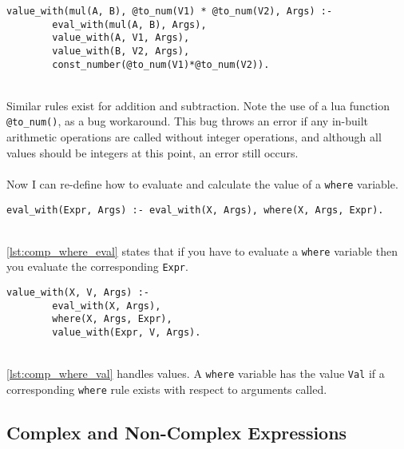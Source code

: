 \begin{lstlisting}[caption={Second attempt at multiplication}, label={lst:comp_mult}, firstnumber=57]
value_with(mul(A, B), @to_num(V1) * @to_num(V2), Args) :- 
		eval_with(mul(A, B), Args), 
		value_with(A, V1, Args), 
		value_with(B, V2, Args), 
		const_number(@to_num(V1)*@to_num(V2)).
\end{lstlisting}
\mbox{} \\
Similar rules exist for addition and subtraction. Note the use of a lua function \lstinline!@to_num()!, as a bug workaround. This bug throws an error if any in-built arithmetic operations are called without integer operations, and although all values should be integers at this point, an error still occurs. \\ \\
Now I can re-define how to evaluate and calculate the value of a \lstinline!where! variable. \\

\begin{lstlisting}[caption={Handling where evaluation}, label={lst:comp_where_eval}, firstnumber=76]
eval_with(Expr, Args) :- eval_with(X, Args), where(X, Args, Expr).
\end{lstlisting}
\mbox{} \\
\ref{lst:comp_where_eval} states that if you have to evaluate a \lstinline!where! variable then you evaluate the corresponding \lstinline!Expr!. \\
 
\begin{lstlisting}[caption={Handling where values}, label={lst:comp_where_val}, firstnumber=64]
value_with(X, V, Args) :- 
		eval_with(X, Args), 
		where(X, Args, Expr), 
		value_with(Expr, V, Args).
\end{lstlisting}
\mbox{} \\
\ref{lst:comp_where_val} handles values. A \lstinline!where! variable has the value \lstinline!Val! if a corresponding \lstinline!where! rule exists with respect to arguments called. \\

\subsection{Complex and Non-Complex Expressions}

